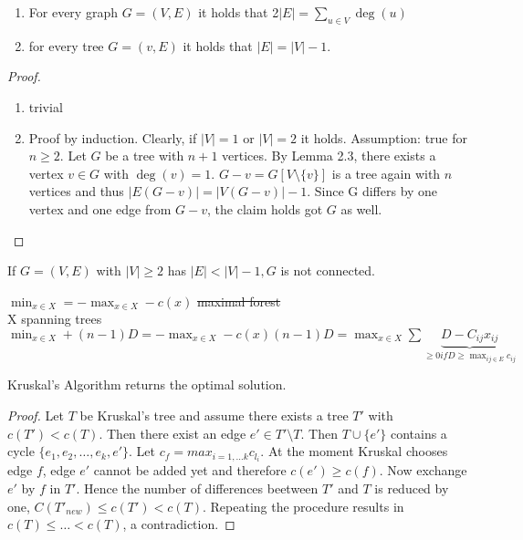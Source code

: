 \begin{lem}
	\begin{enumerate}
	\item For every graph $G=(V,E)$ it holds that 2$|E|=\sum\limits_{u \in V} \deg(u)$
	\item for every tree $G=(v,E)$ it holds that $|E|=|V|-1$.
	\end{enumerate}
	\end{lem}

\begin{proof}



	\begin{enumerate}
		\item trivial
		\item Proof by induction. Clearly, if $|V|=1$ or $|V|=2$ it holds. Assumption: true for $n \geq 2.$
		Let $G$ be a tree with $n+1$ vertices. By Lemma 2.3, there exists a vertex $v \in G$ with $\deg(v)=1$. $G-v=G[V\setminus \{v\}]$ is a tree again with $n$ vertices and thus $|E(G-v)|=|V(G-v)|-1$. Since G differs by one vertex and one edge from $G-v$, the claim holds got $G$ as well.
	\end{enumerate}
\end{proof}


\begin{lem}
If $G=(V,E)$ with $|V| \geq 2$ has $|E|< |V|-1, G$ is not connected.
\end{lem}

$\min_{x \in X} = -\max_{x \in X} -c(x)$ \sout{maximal forest}\\
X spanning trees\\
$\min_{x \in X} + (n-1)D= -\max_{x \in X} -c(x) (n-1)D =\max_{x\in X} \sum \underbrace{D-C_{ij}x_{ij}}_{\geq 0 if D \geq \max_{ij \in E} c_{ij}}$

\begin{thm}
Kruskal's Algorithm returns the optimal solution.
\end{thm}
\begin{proof}
Let $T$ be Kruskal's tree and assume there exists a tree $T'$ with $c(T') < c(T)$. Then there exist an edge $e' \in T'\setminus T$. Then $T \cup \{e'\} $ contains a cycle $\{e_1, e_2, \hdots, e_k, e'\}$. Let $ c_f=max_{i=1, \hdots k}c_{l_i} $. 
At the moment Kruskal chooses edge $f$, edge $e'$ cannot be added yet and therefore $c(e')\geq c(f)$. Now exchange $e'$ by $f$ in $T'$. Hence the number of differences beetween $T'$ and $T$ is reduced by one, $C(T'_{new})\leq c(T') < c(T)$. Repeating the procedure results in $c(T) \leq \hdots < c(T)$, a contradiction.
\end{proof}
